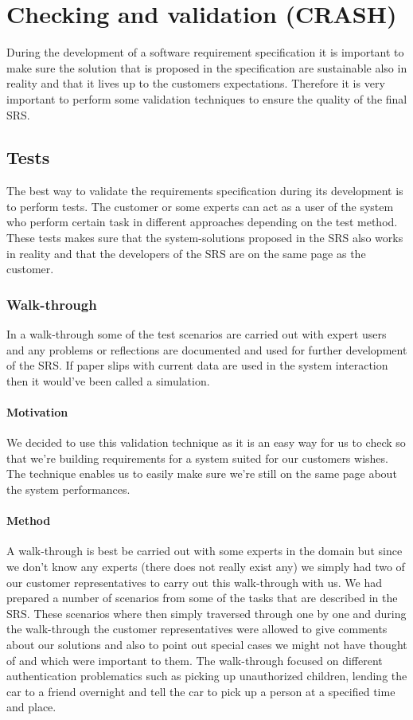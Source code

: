 \documentclass[10pt]{article}
\begin{document}
\section{Checking and validation (CRASH)}
\noindent
During the development of a software requirement specification it is important to make sure the solution that is proposed in the specification are sustainable also in reality and that it lives up to the customers expectations. Therefore it is very important to perform some validation techniques to ensure the quality of the final SRS.
\subsection{Tests}
The best way to validate the requirements specification during its development is to perform tests. The customer or some experts can act as a user of the system who perform certain task in different approaches depending on the test method. These tests makes sure that the system-solutions proposed in the SRS also works in reality and that the developers of the SRS are on the same page as the customer.

\subsubsection{Walk-through}
In a walk-through some of the test scenarios are carried out with expert users and any problems or reflections are documented and used for further development of the SRS. If paper slips with current data are used in the system interaction then it would've been called a simulation.

\paragraph{Motivation}
\hfill \break
We decided to use this validation technique as it is an easy way for us to check so that we're building requirements for a system suited for our customers wishes. The technique enables us to easily make sure we're still on the same page about the system performances.

\paragraph{Method}
\hfill \break
A walk-through is best be carried out with some experts in the domain but since we don't know any experts (there does not really exist any) we simply had two of our customer representatives to carry out this walk-through with us.
We had prepared a number of scenarios from some of the tasks that are described in the SRS. These scenarios where then simply traversed through one by one and during the walk-through the customer representatives were allowed to give comments about our solutions and also to point out special cases we might not have thought of and which were important to them.
The walk-through focused on different authentication problematics such as picking up unauthorized children, lending the car to a friend overnight and tell the car to pick up a person at a specified time and place.
\end{document}
